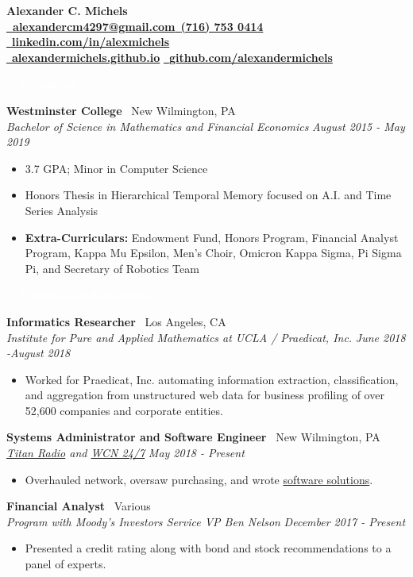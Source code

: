 \documentclass[letterpaper,11pt]{article}
\newcommand{\resitem}[1]{\item[--] #1}
\newcommand{\resheading}[1]{{\vspace{2pt}\large \colorbox{electricpurple}{\begin{minipage}{\textwidth}{\textbf{#1 \vphantom{p\^{E}}}}\end{minipage}}}\vspace{8pt}}
\newcommand{\Position}[4]{
	\vspace{-6pt}
	\textbf{#1} \hfill \faMapPin \ #2 \\
	\textit{#3} \hfill \textit{#4} \\
	\vspace{-4pt}
}
\newenvironment{titemize}{
	\vspace{-6pt}
	\begin{itemize}
		\setlength{\itemsep}{0pt}
		\setlength{\parskip}{0pt}
		\setlength{\topsep}{0pt}
}{\end{itemize}\vspace{-4pt}}
\begin{document}
	
	

		\textbf{\LARGE Alexander C. Michels} \\
	 \href{mailto:alexandercm4297@gmail.com}{\textbf{\faEnvelope \ alexandercm4297@gmail.com}}\hfill\href{tel:17167530414}{\faPhone \ \textbf{(716) 753 0414}} \hfill \href{https://www.linkedin.com/in/alexmichels/}{\faLinkedin \ \textbf{linkedin.com/in/alexmichels}} \\
	\href{http://alexandermichels.github.io}{\faGlobeAmericas \ \textbf{alexandermichels.github.io}} \hfill \href{https://github.com/alexandermichels}{\faGithub \ \textbf{github.com/alexandermichels}} \\
	
	\resheading{\textcolor{white}{\ \faGraduationCap \ Education}}

		\Position{Westminster College}{New Wilmington, PA}{Bachelor of Science in Mathematics and Financial Economics}{August 2015 - May 2019}
		\begin{titemize}
			\resitem{3.7 GPA; Minor in Computer Science}
			\resitem{Honors Thesis in Hierarchical Temporal Memory focused on A.I. and Time Series Analysis}
			\resitem{\textbf{Extra-Curriculars: }Endowment Fund, Honors Program, Financial Analyst Program, Kappa Mu Epsilon, Men’s Choir, Omicron Kappa Sigma, Pi Sigma Pi, and Secretary of Robotics Team}
		\end{titemize}
	
	\resheading{\textcolor{white}{\ \faBriefcase  \ Professional Experience}}

		\Position{Informatics Researcher}{Los Angeles, CA}{Institute for Pure and Applied Mathematics at UCLA / Praedicat, Inc.}{June 2018 -August 2018}
		\begin{titemize}
			\resitem{Worked for Praedicat, Inc. automating information extraction, classification, and aggregation from unstructured web data for business profiling of over 52,600 companies and corporate entities.}
		\end{titemize}

		\Position{Systems Administrator and Software Engineer}{New Wilmington, PA}{\href{http://titanradio.net/}{Titan Radio} and \href{https://www.wcn247.com/}{WCN 24/7}}{May 2018 - Present}
		\begin{titemize}
			\resitem{Overhauled network, oversaw purchasing, and wrote \href{https://github.com/alexandermichels/WeatherWaves}{software solutions}.}
		\end{titemize}

		\Position{Financial Analyst}{Various}{Program with Moody’s Investors Service VP Ben Nelson}{December 2017 - Present}
		\begin{titemize}
			\resitem{Presented a credit rating along with bond and stock recommendations to a panel of experts.}
		\end{titemize}
\end{document}
